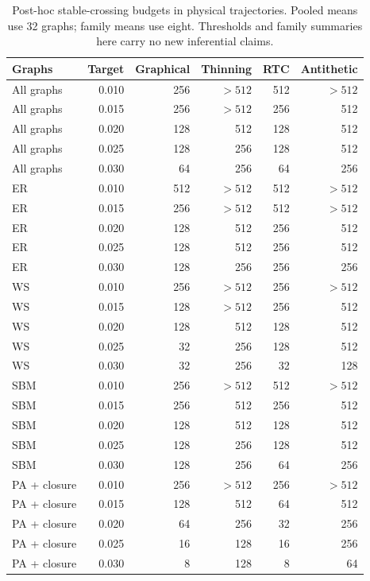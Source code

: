 \documentclass[preprint,11pt,sort&compress]{elsarticle}
\begin{document}
\begin{table}[ht]\centering\small
\caption{Post-hoc stable-crossing budgets in physical trajectories. Pooled means use 32 graphs; family means use eight. Thresholds and family summaries here carry no new inferential claims.}\label{tab:threshold_sensitivity}
\begin{tabular}{lrrrrr}\toprule
Graphs & Target & Graphical & Thinning & RTC & Antithetic\\\midrule
All graphs & 0.010 & 256 & $>512$ & 512 & $>512$\\
All graphs & 0.015 & 256 & $>512$ & 256 & 512\\
All graphs & 0.020 & 128 & 512 & 128 & 512\\
All graphs & 0.025 & 128 & 256 & 128 & 512\\
All graphs & 0.030 & 64 & 256 & 64 & 256\\
ER & 0.010 & 512 & $>512$ & 512 & $>512$\\
ER & 0.015 & 256 & $>512$ & 512 & $>512$\\
ER & 0.020 & 128 & 512 & 256 & 512\\
ER & 0.025 & 128 & 512 & 256 & 512\\
ER & 0.030 & 128 & 256 & 256 & 256\\
WS & 0.010 & 256 & $>512$ & 256 & $>512$\\
WS & 0.015 & 128 & $>512$ & 256 & 512\\
WS & 0.020 & 128 & 512 & 128 & 512\\
WS & 0.025 & 32 & 256 & 128 & 512\\
WS & 0.030 & 32 & 256 & 32 & 128\\
SBM & 0.010 & 256 & $>512$ & 512 & $>512$\\
SBM & 0.015 & 256 & 512 & 256 & 512\\
SBM & 0.020 & 128 & 512 & 128 & 512\\
SBM & 0.025 & 128 & 256 & 128 & 512\\
SBM & 0.030 & 128 & 256 & 64 & 256\\
PA + closure & 0.010 & 256 & $>512$ & 256 & $>512$\\
PA + closure & 0.015 & 128 & 512 & 64 & 512\\
PA + closure & 0.020 & 64 & 256 & 32 & 256\\
PA + closure & 0.025 & 16 & 128 & 16 & 256\\
PA + closure & 0.030 & 8 & 128 & 8 & 64\\
\bottomrule\end{tabular}\end{table}
\FloatBarrier
\end{document}
